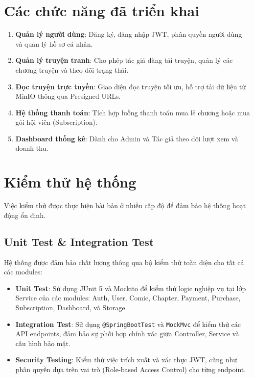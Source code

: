 \section{Các chức năng đã triển khai}
\begin{enumerate}
    \item \textbf{Quản lý người dùng}: Đăng ký, đăng nhập JWT, phân quyền người dùng và quản lý hồ sơ cá nhân.
    \item \textbf{Quản lý truyện tranh}: Cho phép tác giả đăng tải truyện, quản lý các chương truyện và theo dõi trạng thái.
    \item \textbf{Đọc truyện trực tuyến}: Giao diện đọc truyện tối ưu, hỗ trợ tải dữ liệu từ MinIO thông qua Presigned URLs.
    \item \textbf{Hệ thống thanh toán}: Tích hợp luồng thanh toán mua lẻ chương hoặc mua gói hội viên (Subscription).
    \item \textbf{Dashboard thống kê}: Dành cho Admin và Tác giả theo dõi lượt xem và doanh thu.
\end{enumerate}


\section{Kiểm thử hệ thống}
Việc kiểm thử được thực hiện bài bản ở nhiều cấp độ để đảm bảo hệ thống hoạt động ổn định.

\subsection{Unit Test \& Integration Test}
Hệ thống được đảm bảo chất lượng thông qua bộ kiểm thử toàn diện cho tất cả các modules:
\begin{itemize}
    \item \textbf{Unit Test}: Sử dụng JUnit 5 và Mockito để kiểm thử logic nghiệp vụ tại lớp Service của các modules: Auth, User, Comic, Chapter, Payment, Purchase, Subscription, Dashboard, và Storage.
    \item \textbf{Integration Test}: Sử dụng \texttt{@SpringBootTest} và \texttt{MockMvc} để kiểm thử các API endpoints, đảm bảo sự phối hợp chính xác giữa Controller, Service và cấu hình bảo mật.
    \item \textbf{Security Testing}: Kiểm thử việc trích xuất và xác thực JWT, cũng như phân quyền dựa trên vai trò (Role-based Access Control) cho từng endpoint.
\end{itemize}

